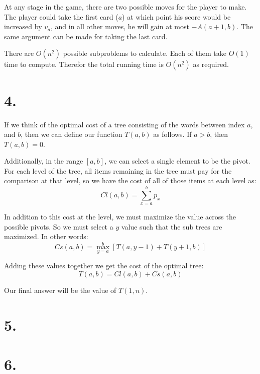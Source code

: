 \documentclass[11pt]{article}
\begin{document}
At any stage in the game, there are two possible moves for the player to make.
The player could take the first card ($a$) at which point his score would be
increased by $v_a$, and in all other moves, he will gain at most $-A(a+1, b)$.
The same argument can be made for taking the last card. 

There are $O(n^2)$ possible subproblems to calculate. Each of them take $O(1)$
time to compute. Therefor the total running time is $O(n^2)$ as required. 
\newpage
\section*{4.}
If we think of the optimal cost of a tree consisting of the words between index
$a$, and $b$, then we can define our function $T(a, b)$ as follows. If $a > b$,
then $T(a,b) = 0$. 

Additionally, in the range $[a,b]$, we can select a single element to be the
pivot. For each level of the tree, all items remaining in the tree must pay for
the comparison at that level, so we have the cost of all of those items at each
level as:
\begin{equation*}
Cl(a, b) = \sum_{x=a}^{b} p_x
\end{equation*}

In addition to this cost at the level, we must maximize the value across the
possible pivots. 
So we must select a $y$ value such that the sub trees are maximized. In other
words:
\begin{equation*}
Cs(a, b) = \max_{y=a}^{b} [T(a, y-1) + T(y+1, b)]
\end{equation*}

Adding these values together we get the cost of the optimal tree:
\begin{equation*}
T(a, b) = Cl(a,b) + Cs(a,b)
\end{equation*}

Our final answer will be the value of $T(1, n)$.
\newpage
\section*{5.}
\newpage
\section*{6.}
\end{document}
